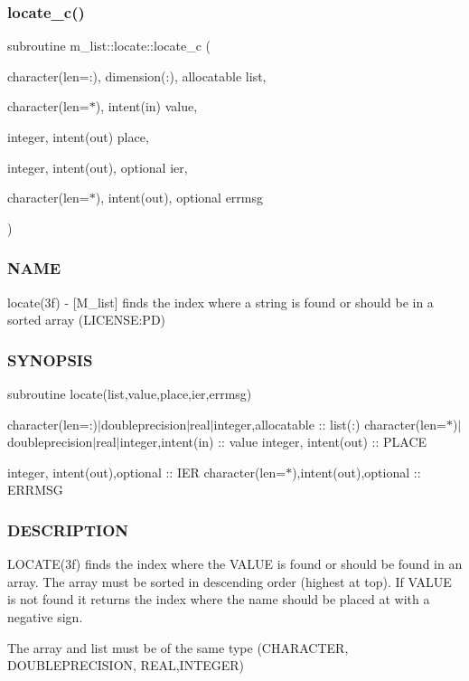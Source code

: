 \subsubsection{\texorpdfstring{locate\+\_\+c()}{locate\_c()}}
{\footnotesize\ttfamily subroutine m\+\_\+list\+::locate\+::locate\+\_\+c (\begin{DoxyParamCaption}\item[{character(len=\+:), dimension(\+:), allocatable}]{list,  }\item[{character(len=$\ast$), intent(in)}]{value,  }\item[{integer, intent(out)}]{place,  }\item[{integer, intent(out), optional}]{ier,  }\item[{character(len=$\ast$), intent(out), optional}]{errmsg }\end{DoxyParamCaption})\hspace{0.3cm}{\ttfamily [private]}}



\subsubsection*{N\+A\+ME}

locate(3f) -\/ \mbox{[}M\+\_\+list\mbox{]} finds the index where a string is found or should be in a sorted array (L\+I\+C\+E\+N\+SE\+:PD) 

\subsubsection*{S\+Y\+N\+O\+P\+S\+IS}

subroutine locate(list,value,place,ier,errmsg)

character(len=\+:)$\vert$doubleprecision$\vert$real$\vert$integer,allocatable \+:\+: list(\+:) character(len=$\ast$)$\vert$doubleprecision$\vert$real$\vert$integer,intent(in) \+:\+: value integer, intent(out) \+:\+: P\+L\+A\+CE

integer, intent(out),optional \+:\+: I\+ER character(len=$\ast$),intent(out),optional \+:\+: E\+R\+R\+M\+SG

\subsubsection*{D\+E\+S\+C\+R\+I\+P\+T\+I\+ON}

\begin{DoxyVerb}LOCATE(3f) finds the index where the VALUE is found or should
be found in an array. The array must be sorted in descending
order (highest at top). If VALUE is not found it returns the index
where the name should be placed at with a negative sign.

The array and list must be of the same type (CHARACTER, DOUBLEPRECISION,
REAL,INTEGER)
\end{DoxyVerb}


